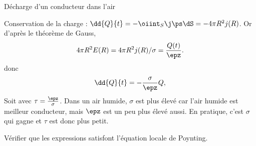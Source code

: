 \begin{exo}[PC][1][devoir]{Décharge d'un conducteur dans l'air}
\begin{quest}
{  
  Conservation de la charge : $\dd{Q}{t} =- \oiint_S \j \ps \dS = -4\pi R^2 j(R)$. Or d'après le théorème de Gauss,
  $$
  4\pi R^2 E(R) = 4\pi R^2 j(R)/\sigma  = \frac{Q(t)}{\epz}.
  $$
  donc
  $$
  \dd{Q}{t} = - \frac{\sigma}{ \epz} Q
  ,
  $$
  Soit
  avec $\tau = \frac{\epz}{\sigma}$. Dans un air humide, $\sigma$ est plus élevé car l’air humide est meilleur conducteur, mais $\epz$ est un peu plus élevé aussi. En pratique, c’est $\sigma$ qui gagne et $\tau$ est donc plus petit.
  }
  \item Vérifier que les expressions satisfont l’équation locale de Poynting.
  \end{quest}
  \end{exo}


